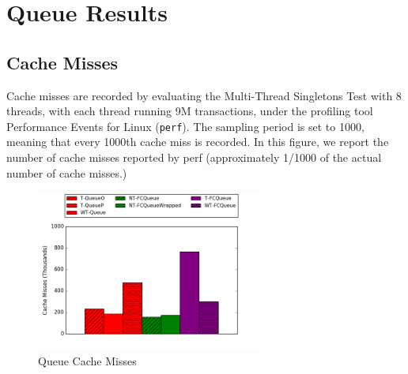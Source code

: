\chapter{Queue Results}
\label{app:queues}

\vspace{-12pt}
\section{Cache Misses}

Cache misses are recorded by evaluating the Multi-Thread Singletons Test with 8 threads, with each thread running 9M transactions, under the profiling tool Performance Events for Linux (\texttt{perf}). The sampling period is set to 1000, meaning that every 1000th cache miss is recorded.
In this figure, we report the number of cache misses reported by perf (approximately 1/1000 of the actual number of cache misses.)

\begin{figure}[H]
    \centering
    \includegraphics[width=0.66\textwidth]{fcqueues/cm.png}
    \caption{Queue Cache Misses}
\label{fig:cm_queues}
\end{figure}

